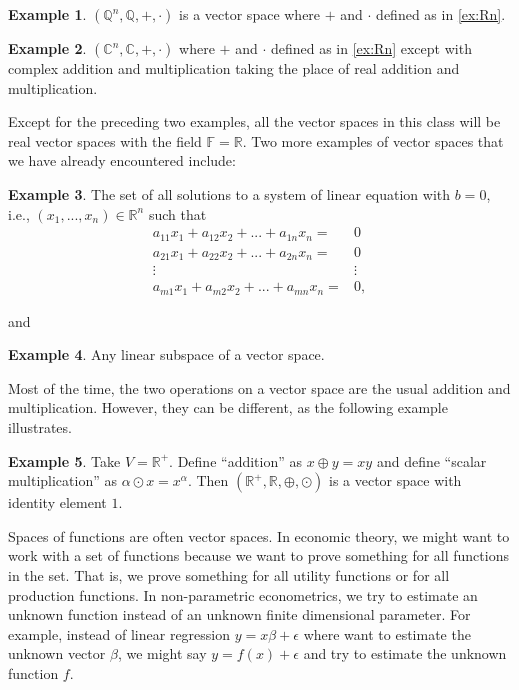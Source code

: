 \documentclass[12pt,reqno]{amsart}
\def\R{\mathbb{R}}
\theoremstyle{definition}
\newtheorem{example}{Example}[section]
\begin{document}
\begin{example}
  $(\mathbb{Q}^n, \mathbb{Q}, +, \cdot)$ is a vector space
  where $+$ and $\cdot$ defined as in \ref{ex:Rn}.
\end{example}

\begin{example}
  $(\mathbb{C}^n, \mathbb{C}, +, \cdot)$ where $+$ and $\cdot$ defined
  as in \ref{ex:Rn} except with complex addition and multiplication
  taking the place of real addition and multiplication. 
\end{example}
Except for the preceding two examples, all the vector spaces in this
class will be real vector spaces with the field $\mathbb{F} =
\mathbb{R}$. Two more examples of vector spaces that we have already
encountered include:
\begin{example}
  The set of all solutions to a system of linear equation with $b=0$,
  i.e., $(x_1, ..., x_n) \in \R^n$ such that 
  \begin{align*}
    a_{11} x_1 + a_{12} x_2 + ... + a_{1n} x_n = & 0 \\
    a_{21} x_1 + a_{22} x_2 + ... + a_{2n} x_n = & 0 \\
    \vdots & \vdots \\
    a_{m1} x_1 + a_{m2} x_2 + ... + a_{mn} x_n = & 0 ,
  \end{align*}
\end{example}  
and 
\begin{example}
  Any linear subspace of a vector space.
\end{example}
Most of the time, the two operations on a vector space are the usual
addition and multiplication. However, they can be different, as the
following example illustrates.
\begin{example}
  Take $V = \R^+$. Define ``addition'' as $x \oplus y = xy$ and define
  ``scalar multiplication'' as $\alpha \odot x = x^\alpha$. Then
  $(\R^+,\R, \oplus, \odot)$ is a vector space with identity element
  $1$.   
\end{example}

Spaces of functions are often vector spaces. In economic
theory, we might want to work with a set of functions because we want
to prove something for all functions in the set. That is, we prove
something for all utility functions or for all production
functions. In non-parametric econometrics, we try to estimate an
unknown function instead of an unknown finite dimensional
parameter. For example, instead of linear regression $y = x\beta +
\epsilon$ where want to estimate the unknown vector $\beta$, we might
say $y = f(x) + \epsilon$ and try to estimate the unknown function
$f$. 
\end{document}
